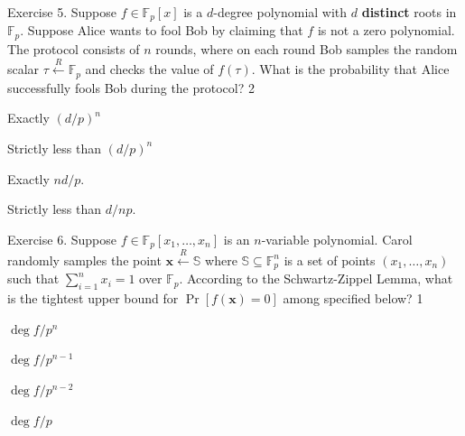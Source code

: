 \documentclass[../lecture-notes-148x210.tex]{subfiles}
\begin{document}
\begin{xexercise}
    {Exercise 5.} { Suppose $f \in \mathbb{F}_p[x]$ is a $d$-degree polynomial
    with $d$ \textbf{distinct} roots in $\mathbb{F}_p$. Suppose Alice wants to
    fool Bob by claiming that $f$ is not a zero polynomial. The protocol
    consists of $n$ rounds, where on each round Bob samples the random scalar
    $\tau \xleftarrow{R} \mathbb{F}_p$ and checks the value of $f(\tau)$. What
    is the probability that Alice successfully fools Bob during the protocol?}
    {2} {
        \item Exactly $(d/p)^n$
        \item Strictly less than $(d/p)^n$
        \item Exactly $nd/p$.
        \item Strictly less than $d/np$.
    }
\end{xexercise}

\begin{xexercise}
    {Exercise 6.} { Suppose $f \in \mathbb{F}_p[x_1,\dots,x_n]$ is an
    $n$-variable polynomial. Carol randomly samples the point $\mathbf{x}
    \xleftarrow{R} \mathbb{S}$ where $\mathbb{S} \subseteq \mathbb{F}_p^n$ is a
    set of points $(x_1,\dots,x_n)$ such that $\sum_{i=1}^n x_i=1$ over
    $\mathbb{F}_p$. According to the Schwartz-Zippel Lemma, what is the tightest
    upper bound for $\Pr[f(\mathbf{x})=0]$ among specified below?}
    {1} {
        \item $\deg f/p^n$
        \item $\deg f/p^{n-1}$
        \item $\deg f/p^{n-2}$
        \item $\deg f/p$
    }
\end{xexercise}
\end{document}
